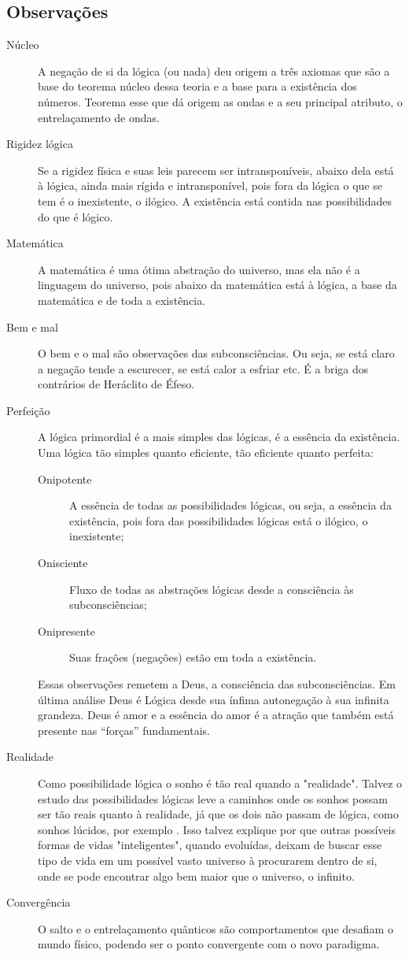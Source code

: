 \subsection{Observações}
	\begin{description}
	   \item[Núcleo] A negação de si da lógica (ou nada) deu origem a três axiomas que são a base do teorema núcleo dessa teoria e a base para a existência dos números. Teorema esse que dá origem as ondas e a seu principal atributo, o entrelaçamento de ondas. 
	   \item[Rigidez lógica] Se a rigidez física e suas leis parecem ser intransponíveis, abaixo dela está à lógica, ainda mais rígida e intransponível, pois fora da lógica o que se tem é o inexistente, o ilógico. A existência está contida nas possibilidades do que é lógico. 
	   \item[Matemática] A matemática é uma ótima abstração do universo, mas ela não é a linguagem do universo, pois abaixo da matemática está à lógica, a base da matemática e de toda a existência.
	   \item[Bem e mal] O bem e o mal são observações das subconsciências. Ou seja, se está claro a negação tende a escurecer, se está calor a esfriar etc. É a briga dos contrários de Heráclito de Éfeso.
	   \item[Perfeição] A lógica primordial é a mais simples das lógicas, é a essência da existência. Uma lógica tão simples quanto eficiente, tão eficiente quanto perfeita:
	   \begin{description}
		   \item[Onipotente] A essência de todas as possibilidades lógicas, ou seja, a essência da existência, pois fora das possibilidades lógicas está o ilógico, o inexistente;
		   \item[Onisciente] Fluxo de todas as abstrações lógicas desde a consciência às subconsciências; 
		   \item[Onipresente] Suas frações (negações) estão em toda a existência.
	   \end{description}
	Essas observações remetem a Deus, a consciência das subconsciências. Em última análise Deus é Lógica desde sua ínfima autonegação à sua infinita grandeza. Deus é amor e a essência do amor é a atração que também está presente nas “forças” fundamentais.
	   \item[Realidade] Como possibilidade lógica o sonho é tão real quando a "realidade". Talvez o estudo das possibilidades lógicas leve a caminhos onde os sonhos possam ser tão reais quanto à realidade, já que os dois não passam de lógica, como sonhos lúcidos, por exemplo \cite{ administradores_principio_pareto}. Isso talvez explique por que outras possíveis formas de vidas "inteligentes", quando evoluídas, deixam de buscar esse tipo de vida em um possível vasto universo à procurarem dentro de si, onde se pode encontrar algo bem maior que o universo, o infinito.
	   \item[Convergência] O salto e o entrelaçamento quânticos são comportamentos que desafiam o mundo físico, podendo ser o ponto convergente com o novo paradigma.
	\end{description}